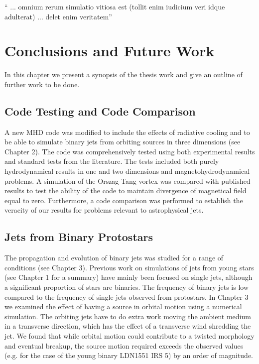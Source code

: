 \begin{savequote}
`` ... omnium rerum simulatio vitiosa est (tollit enim iudicium veri idque adulterat) ... delet enim veritatem''
\end{savequote}




\chapter{Conclusions and Future Work}

In this chapter we present a synopsis of the thesis work and give an outline of
further work to be done.

\section{Code Testing and Code Comparison}
A new MHD code was modified to include the effects of radiative cooling and to
be able to simulate binary jets from orbiting sources in three dimensions
(see Chapter 2).
The code was comprehensively tested using both experimental results and standard
tests from the literature.
The tests included both purely hydrodynamical results in one and two dimensions
and magnetohydrodynamical problems.
A simulation of the Orszag-Tang vortex was compared with published results to
test the ability of the code to maintain divergence of magnetical field equal to
zero.
Furthermore, a code comparison was performed  to establish the veracity of our results for problems relevant to astrophysical jets. 


\section{Jets from Binary Protostars}
The propagation and evolution of binary jets was studied for a range of
conditions (see Chapter 3).
Previous work on simulations of jets from young stars (see Chapter 1 for a
summary) have mainly been focused on single jets, although a significant
proportion of stars are binaries. 
The frequency of binary jets is low compared to the frequency of single
jets observed from protostars.
In Chapter 3 we examined the effect of having a source in orbital motion using a
numerical simulation.
The orbiting jets have to do extra work moving the ambient medium in a
transverse direction, which has the effect of a transverse wind shredding the
jet.
We found that while orbital motion could contribute to a twisted morphology and
eventual breakup, the source motion required exceeds the observed values (e.g. for the
case of the young binary LDN1551 IRS 5) by an order of magnitude.

